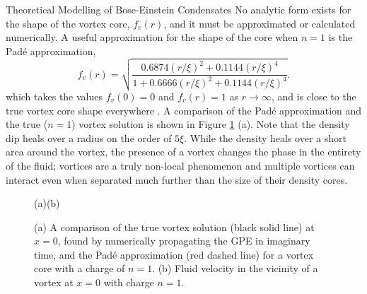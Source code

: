 \begin{chapter}{\label{cha:theoretical_model}Theoretical Modelling of Bose-Einstein Condensates}
No analytic form exists for the shape of the vortex core, $f_v(r)$, and it must be approximated or calculated numerically. A useful approximation for the shape of the core when $n=1$ is the Pad\'e approximation,
	\begin{equation}
		f_v(r) = \sqrt{\frac{0.6874(r/\xi)^2 + 0.1144(r/\xi)^4}{1+0.6666(r/\xi)^2+0.1144(r/\xi)^4}}.
	\end{equation}
which takes the values $f_v(0) = 0$ and $f_v(r) = 1$ as $r\rightarrow\infty$, and is close to the true vortex core shape everywhere \cite{berloff2004}. A comparison of the Pad\'e approximation and the true ($n=1$) vortex solution is shown in Figure \ref{fig_vortex} (a). Note that the density dip heals over a radius on the order of $5\xi$. While the density heals over a short area around the vortex, the presence of a vortex changes the phase in the entirety of the fluid; vortices are a truly non-local phenomenon and multiple vortices can interact even when separated much further than the size of their density cores.

 \begin{figure}[!ht]
	\hspace{-0.13\linewidth}(a)\hspace{0.45\linewidth}(b)\hspace{0.03\linewidth}\\
	\centering
  \caption{(a) A comparison of the true vortex solution (black solid line) at $x=0$, found by numerically propagating the GPE in imaginary time, and the Pad\'e approximation (red dashed line) for a vortex core with a charge of $n=1$. (b) Fluid velocity in the vicinity of a vortex at $x=0$ with charge $n=1$.}\label{fig_vortex}
 \end{figure}
 

\end{chapter}
